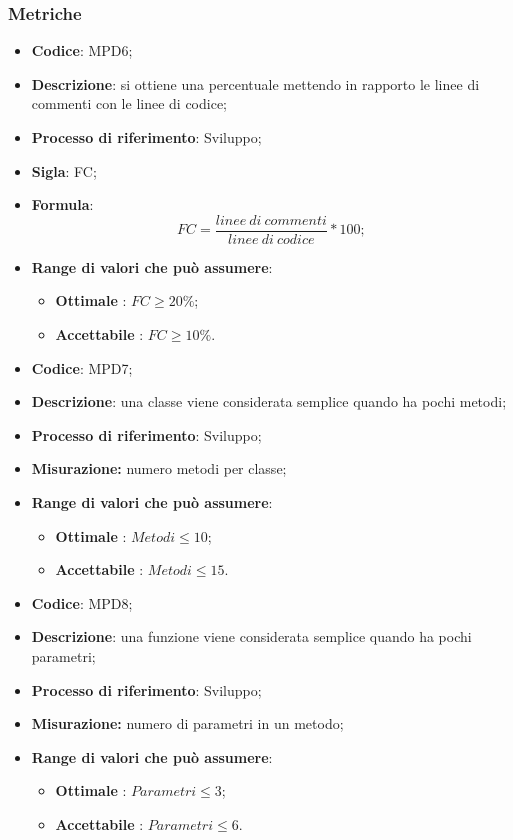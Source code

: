 \subsubsection{Metriche}
\vspace{-1cm}
\begin{itemize}
	\item \textbf{Codice}: MPD6;
	\item \textbf{Descrizione}: si ottiene una percentuale mettendo in rapporto le linee di commenti con le linee di codice;
	\item \textbf{Processo di riferimento}: Sviluppo;
	\item \textbf{Sigla}: FC;
	\item \textbf{Formula}: \[FC=\frac{linee \ di \ commenti}{linee \ di \ codice}\ast100;\]
	\item \textbf{Range di valori che può assumere}: 
		\begin{itemize}
			\item \textbf{Ottimale} : $FC \geq 20 \%$;
			\item \textbf{Accettabile} : $FC \geq 10 \%$.
		\end{itemize}
\end{itemize}
\vspace{-1cm}
\begin{itemize}
	\item \textbf{Codice}: MPD7;
	\item \textbf{Descrizione}: una classe viene considerata semplice quando ha pochi metodi;
	\item \textbf{Processo di riferimento}: Sviluppo;
	\item \textbf{Misurazione:} numero metodi per classe;
	\item \textbf{Range di valori che può assumere}: 
		\begin{itemize}
			\item \textbf{Ottimale} : $Metodi \leq 10$;
			\item \textbf{Accettabile} : $Metodi \leq 15$.
		\end{itemize}
\end{itemize}
\vspace{-1cm}
\begin{itemize}
	\item \textbf{Codice}: MPD8;
	\item \textbf{Descrizione}: una funzione viene considerata semplice quando ha pochi parametri;
	\item \textbf{Processo di riferimento}: Sviluppo;
	\item \textbf{Misurazione:} numero di parametri in un metodo;
	\item \textbf{Range di valori che può assumere}: 
		\begin{itemize}
			\item \textbf{Ottimale} : $Parametri \leq 3$;
			\item \textbf{Accettabile} : $Parametri \leq 6$.
		\end{itemize}
\end{itemize}
